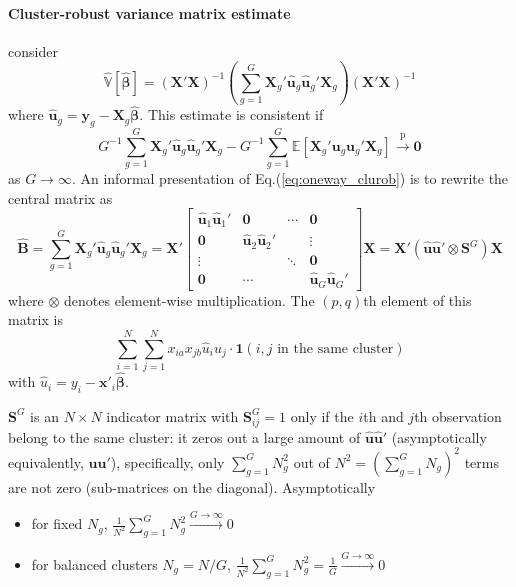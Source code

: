 \documentclass[twoside]{article}
\begin{document}
\paragraph*{Cluster-robust variance matrix estimate} consider 
\begin{equation}\label{eq:oneway_clurob}
    \hat{\mathbb{V}} \left[\hat{\boldsymbol{\beta}}\right] = \left(\mathbf{X'X}\right)^{-1}\left(\sum^G_{g=1} \mathbf{X}_g'\hat{\mathbf{u}}_g \hat{\mathbf{u}}_g' \mathbf{X}_g \right) \left(\mathbf{X'X}\right)^{-1}
\end{equation}
where $\hat{\mathbf{u}}_g = \mathbf{y}_g - \mathbf{X}_g\hat{\boldsymbol{\beta}}$. This estimate is consistent if $$ G^{-1}\sum^G_{g=1}\mathbf{X}_g'\hat{\mathbf{u}}_g \hat{\mathbf{u}}_g' \mathbf{X}_g - G^{-1}\sum^G_{g=1}\mathbb{E}\left[ \mathbf{X}_g' \mathbf{u}_g \mathbf{u}_g' \mathbf{X}_g \right] \xrightarrow{\mathrm{p}} \mathbf{0} $$ as $G\rightarrow \infty$. 
An informal presentation of Eq.(\ref{eq:oneway_clurob}) is to rewrite the central matrix as 
\begin{equation}\label{eq:onewayclu_centralmat}
    \hat{\mathbf{B}} = \sum^G_{g=1} \mathbf{X}_g'\hat{\mathbf{u}}_g \hat{\mathbf{u}}_g' \mathbf{X}_g = \mathbf{X}'\begin{bmatrix}
        \hat{\mathbf{u}}_1\hat{\mathbf{u}}_1' & \mathbf{0} & \cdots & \mathbf{0}\\
        \mathbf{0} & \hat{\mathbf{u}}_2\hat{\mathbf{u}}_2' & & \vdots \\
        \vdots & & \ddots & \mathbf{0} \\
        \mathbf{0} & \cdots & & \hat{\mathbf{u}}_G\hat{\mathbf{u}}_G'
    \end{bmatrix}\mathbf{X} = \mathbf{X}'\left(\hat{\mathbf{u}}\hat{\mathbf{u}}' \otimes \mathbf{S}^G \right) \mathbf{X} 
\end{equation}
where $\otimes$ denotes element-wise multiplication. The $(p,q)$th element of this matrix is 
\begin{equation*}
    \sum^N_{i=1}\sum^N_{j=1}x_{ia}x_{jb}\hat{u}_i\hat{u}_j \cdot \mathbf{1}\left(i,j\text{ in the same cluster}\right)
\end{equation*}
with $\hat{u}_i = y_i - \mathbf{x}'_i \hat{\boldsymbol{\beta}}$.

$\mathbf{S}^G$ is an $N\times N$ indicator matrix with $\mathbf{S}_{ij}^G=1$ only if the $i$th and $j$th observation belong to the same cluster: it zeros out a large amount of $\hat{\mathbf{u}}\hat{\mathbf{u}}'$ (asymptotically equivalently, ${\mathbf{u}}{\mathbf{u}}'$), specifically, only $\sum^G_{g=1}N_g^2$ out of $N^2 = \left(\sum^G_{g=1}N_g\right)^2$ terms are not zero (sub-matrices on the diagonal). Asymptotically
\begin{itemize}
    \item for fixed $N_g$, $\frac{1}{{N^2}}\sum^G_{g=1}{N^2_g}\xrightarrow{G\rightarrow\infty}0$
    \item for balanced clusters $N_g = N/G$, $\frac{1}{{N^2}}\sum^G_{g=1}{N^2_g} = \frac{1}{G} \xrightarrow{G\rightarrow\infty}0$
\end{itemize}
\end{document}
